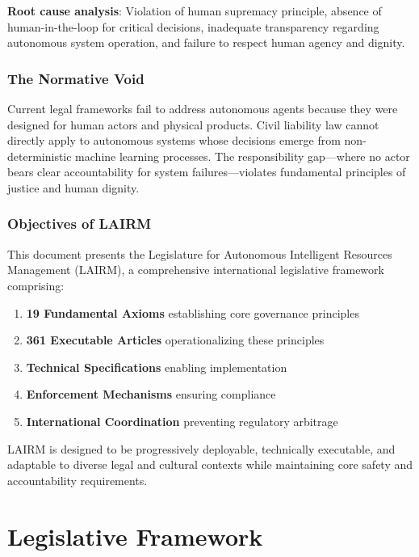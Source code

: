 \documentclass[12pt,a4paper,twoside,openright]{book}
\begin{document}
\textbf{Root cause analysis}: Violation of human supremacy principle, absence of human-in-the-loop for critical decisions, inadequate transparency regarding autonomous system operation, and failure to respect human agency and dignity.

\section{The Normative Void}

Current legal frameworks fail to address autonomous agents because they were designed for human actors and physical products. Civil liability law cannot directly apply to autonomous systems whose decisions emerge from non-deterministic machine learning processes. The responsibility gap—where no actor bears clear accountability for system failures—violates fundamental principles of justice and human dignity.

\section{Objectives of LAIRM}

This document presents the Legislature for Autonomous Intelligent Resources Management (LAIRM), a comprehensive international legislative framework comprising:

\begin{enumerate}
    \item \textbf{19 Fundamental Axioms} establishing core governance principles
    \item \textbf{361 Executable Articles} operationalizing these principles
    \item \textbf{Technical Specifications} enabling implementation
    \item \textbf{Enforcement Mechanisms} ensuring compliance
    \item \textbf{International Coordination} preventing regulatory arbitrage
\end{enumerate}

LAIRM is designed to be progressively deployable, technically executable, and adaptable to diverse legal and cultural contexts while maintaining core safety and accountability requirements.

\part{Legislative Framework}
\end{document}
